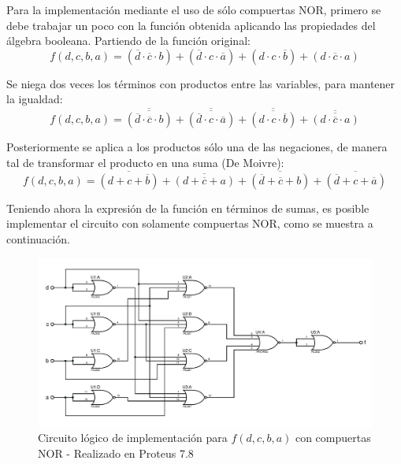 Para la implementación mediante el uso de sólo compuertas NOR, primero 
se debe trabajar un poco con la función obtenida aplicando las propiedades 
del álgebra booleana. Partiendo de la función original:
\[
    f(d,c,b,a)=(\overline{d} \cdot \overline{c} \cdot b)+
    (\overline{d} \cdot c \cdot \overline{a})+
    (d \cdot c \cdot \overline{b})+  
    (d \cdot \overline{c} \cdot a)  
\]
\par
Se niega dos veces los términos con productos entre las variables, 
para mantener la igualdad:
\[
    f(d,c,b,a)=\overline{\overline{(\overline{d} \cdot \overline{c} \cdot b)}}+
    \overline{\overline{(\overline{d} \cdot c \cdot \overline{a})}}+
    \overline{\overline{(d \cdot c \cdot \overline{b})}}+
    \overline{\overline{(d \cdot \overline{c} \cdot a)  }}
\]
\par
Posteriormente se aplica a los productos sólo una de las negaciones, de 
manera tal de transformar el producto en una suma (De Moivre):
\[
    \boxed{f(d,c,b,a)=\overline{(d+c+\overline{b})}+
    \overline{(d+\overline{c}+a)}+
    \overline{(\overline{d}+\overline{c}+b)}+
    \overline{(\overline{d}+c+\overline{a})}}    
\]
\par

Teniendo ahora la expresión de la función en términos de sumas, es posible 
implementar el circuito con solamente compuertas NOR, como se muestra 
a continuación.

\begin{figure}[H]
    \begin{centering}
    \includegraphics[width=1\textwidth]{ImplementacionEj2_NOR}
    \par\end{centering}
    \caption{Circuito lógico de implementación para $f(d,c,b,a)$ 
    con compuertas NOR - Realizado en Proteus 7.8}
\end{figure}

